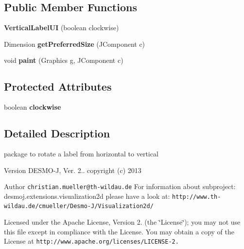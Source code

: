 \subsection*{Public Member Functions}
\begin{DoxyCompactItemize}
\item 
{\bfseries Vertical\-Label\-U\-I} (boolean clockwise)\label{classdesmoj_1_1extensions_1_1visualization2d_1_1engine_1_1util_1_1_vertical_label_u_i_a6169aa8625988dc7de846e7c6b10be82}

\item 
Dimension {\bfseries get\-Preferred\-Size} (J\-Component c)\label{classdesmoj_1_1extensions_1_1visualization2d_1_1engine_1_1util_1_1_vertical_label_u_i_a3987e07e66c12f6e2d3723ae9e6d67f0}

\item 
void {\bfseries paint} (Graphics g, J\-Component c)\label{classdesmoj_1_1extensions_1_1visualization2d_1_1engine_1_1util_1_1_vertical_label_u_i_ad83fdf37ce3e3cfa6e149728987b7612}

\end{DoxyCompactItemize}
\subsection*{Protected Attributes}
\begin{DoxyCompactItemize}
\item 
boolean {\bfseries clockwise}\label{classdesmoj_1_1extensions_1_1visualization2d_1_1engine_1_1util_1_1_vertical_label_u_i_a5b205bfe98334896b0ff5a9a48277b92}

\end{DoxyCompactItemize}


\subsection{Detailed Description}
package to rotate a label from horizontal to vertical

\begin{DoxyVersion}{Version}
D\-E\-S\-M\-O-\/\-J, Ver. 2.. copyright (c) 2013 
\end{DoxyVersion}
\begin{DoxyAuthor}{Author}
{\tt christian.\-mueller@th-\/wildau.\-de} For information about subproject\-: desmoj.\-extensions.\-visualization2d please have a look at\-: {\tt http\-://www.\-th-\/wildau.\-de/cmueller/\-Desmo-\/\-J/\-Visualization2d/}
\end{DoxyAuthor}
Licensed under the Apache License, Version 2. (the \char`\"{}\-License\char`\"{}); you may not use this file except in compliance with the License. You may obtain a copy of the License at {\tt http\-://www.\-apache.\-org/licenses/\-L\-I\-C\-E\-N\-S\-E-\/2.}

